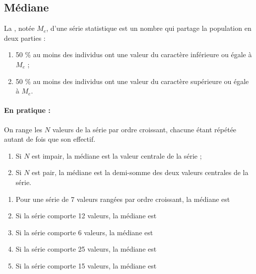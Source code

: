 \bigskip



\subsection{Médiane}

\begin{definition}
    La , notée $M_e$, d'une série statistique est un
  nombre qui partage la population en deux parties :
  \begin{enumerate}
  \item 50 \% au moins des individus ont une valeur du caractère
    inférieure ou égale à $M_e$ ;
  \item 50 \% au moins des individus ont une valeur du caractère
    supérieure ou égale à $M_e$.
  \end{enumerate}  

    
\end{definition}


\paragraph{En pratique :}On range les $N$ valeurs de la série par ordre
  croissant, chacune étant répétée autant de fois que son effectif.


\begin{enumerate}
\item Si $N$ est impair, la médiane est la valeur centrale de la série ;
\item Si $N$ est pair, la médiane est la demi-somme des deux valeurs
  centrales de la série.
\end{enumerate}

\medskip

\begin{example}
\begin{enumerate}
\item Pour une série de 7 valeurs rangées par ordre
    croissant, la médiane est \comp \comp 
\item Si la série comporte 12 valeurs, la médiane est \comp \comp
  \comp 
\item Si la série comporte 6 valeurs, la médiane est \comp \comp
  \comp 
\item Si la série comporte 25 valeurs, la médiane est \comp \comp 
\item Si la série comporte 15 valeurs, la médiane est \comp \comp \comp
\end{enumerate}
    
\end{example}



